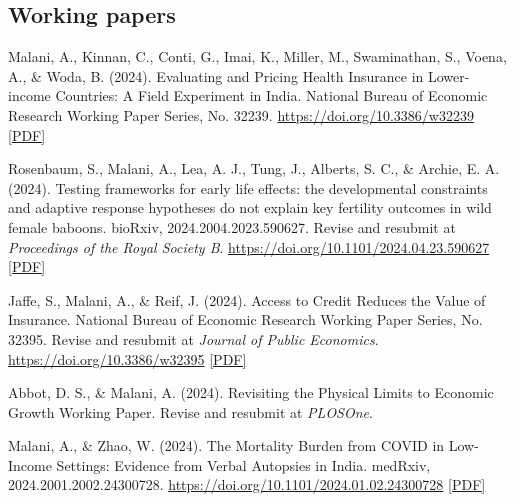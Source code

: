     \subsection*{Working papers}

    \begin{tablist}

        \item[2024] \tab{}Malani, A., Kinnan, C., Conti, G., Imai, K., Miller, M., Swaminathan, S., Voena, A., \& Woda, B. (2024). Evaluating and Pricing Health Insurance in Lower-income Countries: A Field Experiment in India. National Bureau of Economic Research Working Paper Series, No. 32239. \href{https://doi.org/10.3386/w32239}{https://doi.org/10.3386/w32239} \href{https://github.com/anup-malani/website_personal/blob/main/publications/2024_Malani_NBERw32239_PricingHealthInsuranceIndia.pdf}{[PDF]} 
        
        \item[2024] \tab{}Rosenbaum, S., Malani, A., Lea, A. J., Tung, J., Alberts, S. C., \& Archie, E. A. (2024). Testing frameworks for early life effects: the developmental constraints and adaptive response hypotheses do not explain key fertility outcomes in wild female baboons. bioRxiv, 2024.2004.2023.590627. Revise and resubmit at \textit{Proceedings of the Royal Society B}.  \href{https://doi.org/10.1101/2024.04.23.590627}{https://doi.org/10.1101/2024.04.23.590627} \href{https://github.com/anup-malani/website_personal/blob/main/publications/2024_RosenbaumMalani_Biorxiv_EarlyLife.pdf}{[PDF]} 

        \item[2024] \tab{}Jaffe, S., Malani, A., \& Reif, J. (2024). Access to Credit Reduces the Value of Insurance. National Bureau of Economic Research Working Paper Series, No. 32395. Revise and resubmit at \textit{Journal of Public Economics}.  \href{https://doi.org/10.3386/w32395}{https://doi.org/10.3386/w32395} \href{https://github.com/anup-malani/website_personal/blob/main/publications/2024_JaffeMalani_NBERw32395_CreditReducesValueInsurance.pdf}{[PDF]} 

        \item[2024] \tab{}Abbot, D. S., \& Malani, A. (2024). Revisiting the Physical Limits to Economic Growth Working Paper. Revise and resubmit at \textit{PLOSOne}. 

        \item[2024] \tab{}Malani, A., \& Zhao, W. (2024). The Mortality Burden from COVID in Low-Income Settings: Evidence from Verbal Autopsies in India. medRxiv, 2024.2001.2002.24300728. \href{https://doi.org/10.1101/2024.01.02.24300728}{https://doi.org/10.1101/2024.01.02.24300728} \href{https://github.com/anup-malani/website_personal/blob/main/publications/2024_Malani_Medrxiv_VerbalAutopsies.pdf}{[PDF]} 


\end{tablist}
